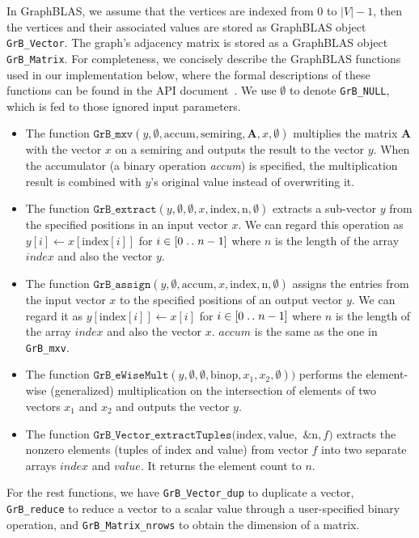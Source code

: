 \documentclass{sokendai_thesis} %
\newcommand{\isep}{\mathrel{{.}\,{.}}\nobreak}
\begin{document}
In GraphBLAS, we assume that the vertices are indexed from $0$ to $|V|-1$, then the vertices and their associated values are stored as GraphBLAS object \texttt{GrB\_Vector}.
The graph's adjacency matrix is stored as a GraphBLAS object \texttt{GrB\_Matrix}.
For completeness, we concisely describe the GraphBLAS functions used in our implementation below, where the formal descriptions of these functions can be found in the API document~\cite{graphblas}.
We use $\emptyset$ to denote \texttt{GrB\_NULL}, which is fed to those ignored input parameters.
\begin{itemize}
\item
  The function $\texttt{GrB\_mxv}(\mathit{y}, \emptyset, \text{accum}, \text{semiring}, \mathbf{A}, \mathit{x}, \emptyset)$ multiplies the matrix $\mathbf{A}$ with the vector $\mathit{x}$ on a semiring and outputs the result to the vector $\mathit{y}$.
  When the accumulator (a binary operation \textit{accum}) is specified, the multiplication result is combined with $y$'s original value instead of overwriting it.
\item
  The function $\texttt{GrB\_extract}(\mathit{y}, \emptyset, \emptyset, \mathit{x}, \text{index}, \text{n}, \emptyset)$ extracts a sub-vector $y$ from the specified positions in an input vector $x$.
  We can regard this operation as $y[i]\leftarrow x[\text{index}[i]]$ for $i\in[0\isep n-1]$ where $n$ is the length of the array $\mathit{index}$ and also the vector $\mathit{y}$.
\item
  The function $\texttt{GrB\_assign}(\mathit{y}, \emptyset, \text{accum}, \mathit{x}, \text{index}, \text{n}, \emptyset)$ assigns the entries from the input vector $x$ to the specified positions of an output vector $y$.
  We can regard it as $y[\text{index}[i]]\leftarrow x[i]$ for $i\in[0\isep n-1]$ where $n$ is the length of the array $\mathit{index}$ and also the vector $x$.
  $\mathit{accum}$ is the same as the one in \texttt{GrB\_mxv}.
\item
  The function $\texttt{GrB\_eWiseMult}(\mathit{y}, \emptyset, \emptyset, \text{binop}, \mathit{x}_1, \mathit{x}_2, \emptyset))$ performs the element-wise (generalized) multiplication on the intersection of elements of two vectors $x_1$ and $x_2$ and outputs the vector $y$.
\item
  The function $\texttt{GrB\_Vector\_extractTuples}(\text{index}, \text{value},$ $\&\text{n}, f)$ extracts the nonzero elements (tuples of index and value) from vector $f$ into two separate arrays $\mathit{index}$ and $\mathit{value}$.
  It returns the element count to $n$.
\end{itemize}
For the rest functions, we have \texttt{GrB\_Vector\_dup} to duplicate a vector, \texttt{GrB\_reduce} to reduce a vector to a scalar value through a user-specified binary operation, and \texttt{GrB\_Matrix\_nrows} to obtain the dimension of a matrix.
\end{document}
